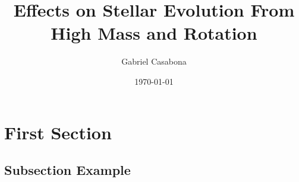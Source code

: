 \documentclass{beamer}
\title[Rotating Stars]{Effects on Stellar Evolution From High Mass and Rotation} %
\author{Gabriel Casabona} %
\institute[UMassD] %
{
University of Massachusetts Dartmouth \\ %
\medskip
\textit{Stellar Structure Final PHY 510} %
}
\date{\today} %
\begin{document}
\begin{frame}
\titlepage %
\end{frame}



\section{First Section} %

\subsection{Subsection Example} %


\end{document}
